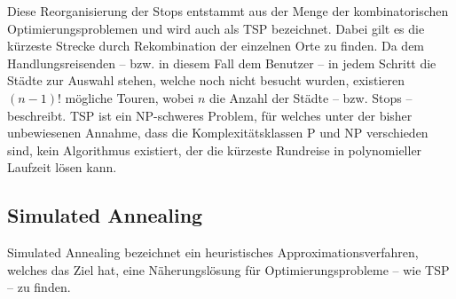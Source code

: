 		Diese Reorganisierung der Stops entstammt aus der Menge der kombinatorischen Optimierungsproblemen und wird auch als \ac{TSP} bezeichnet. Dabei gilt es die kürzeste Strecke durch Rekombination der einzelnen Orte zu finden. Da dem Handlungsreisenden -- bzw. in diesem Fall dem Benutzer -- in jedem Schritt die Städte zur Auswahl stehen, welche noch nicht besucht wurden, existieren $(n - 1)!$ mögliche Touren, wobei $n$ die Anzahl der Städte -- bzw. Stops -- beschreibt. \acs{TSP} ist ein NP-schweres Problem, für welches unter der bisher unbewiesenen Annahme, dass die Komplexitätsklassen P und NP verschieden sind, kein Algorithmus existiert, der die kürzeste Rundreise in polynomieller Laufzeit lösen kann.
		
		\subsection*{Simulated Annealing}
		
		Simulated Annealing bezeichnet ein heuristisches Approximationsverfahren, welches das Ziel hat, eine Näherungslösung für Optimierungsprobleme -- wie \acs{TSP} -- zu finden. 
			
		
